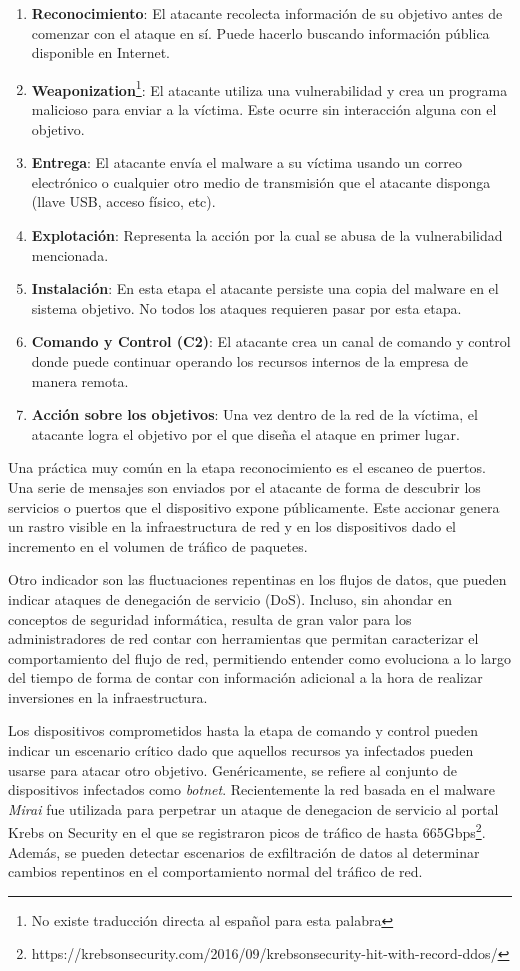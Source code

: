 \documentclass[a4paper,10pt, oneside]{article}
\begin{document}
\begin{enumerate}
\item \textbf{Reconocimiento}: El atacante recolecta información de su objetivo antes de comenzar con el ataque en sí. Puede hacerlo buscando información pública disponible en Internet.
\item \textbf{Weaponization}\footnote{No existe traducción directa al español para esta palabra}: El atacante utiliza una vulnerabilidad y crea un programa malicioso para enviar a la víctima. Este ocurre sin interacción alguna con el objetivo.
\item \textbf{Entrega}: El atacante envía el malware a su víctima usando un correo electrónico o cualquier otro medio de transmisión que el atacante disponga (llave USB, acceso físico, etc).
\item \textbf{Explotación}: Representa la acción por la cual se abusa de la vulnerabilidad mencionada.
\item \textbf{Instalación}: En esta etapa el atacante persiste una copia del malware en el sistema objetivo. No todos los ataques requieren pasar por esta etapa.
\item \textbf{Comando y Control (C2)}: El atacante crea un canal de comando y control donde puede continuar operando los recursos internos de la empresa de manera remota.
\item \textbf{Acción sobre los objetivos}: Una vez dentro de la red de la víctima, el atacante logra el objetivo por el que diseña el ataque en primer lugar.
\end{enumerate}


Una práctica muy común en la etapa reconocimiento es el escaneo de puertos. Una serie de mensajes son enviados por el atacante de forma de descubrir los servicios o puertos que el dispositivo expone públicamente. Este accionar genera un rastro visible en la infraestructura de red y en los dispositivos dado el incremento en el volumen de tráfico de paquetes. 


Otro indicador son las fluctuaciones repentinas en los flujos de datos, que pueden indicar ataques de denegación de servicio (DoS). Incluso, sin ahondar en conceptos de seguridad informática, resulta de gran valor para los administradores de red contar con herramientas que permitan caracterizar el comportamiento del flujo de red, permitiendo entender como evoluciona a lo largo del tiempo de forma de contar con información adicional a la hora de realizar inversiones en la infraestructura.

Los dispositivos comprometidos hasta la etapa de comando y control pueden indicar un escenario crítico dado que aquellos recursos ya infectados pueden usarse para atacar otro objetivo. Genéricamente, se refiere al conjunto de dispositivos infectados como \textit{botnet}. Recientemente la red basada en el malware \textit{Mirai} fue utilizada para perpetrar un ataque de denegacion de servicio al portal Krebs on Security en el que se registraron picos de tráfico de hasta 665Gbps\footnote{https://krebsonsecurity.com/2016/09/krebsonsecurity-hit-with-record-ddos/}. Además, se pueden detectar escenarios de exfiltración de datos al determinar cambios repentinos en el comportamiento normal del tráfico de red.
\end{document}
